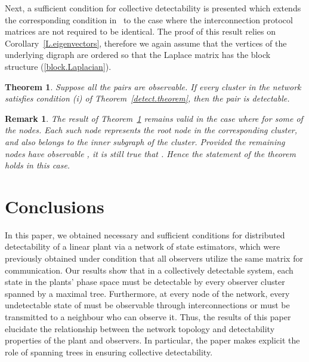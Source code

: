 \documentclass[a4paper,10pt,conference]{ieeeconf}
\newtheorem{theorem}{Theorem}
\newtheorem{remark}{Remark}
\begin{document}
   

Next, a sufficient condition for collective detectability is presented which
extends the corresponding condition in~\cite[Theorem~4]{U7b-journal} to the
case where the interconnection protocol matrices  are not required to be
identical. The proof of this result relies on
Corollary~\ref{L.eigenvectors}, therefore we again assume 
that the vertices of the underlying digraph are ordered so that the Laplace
matrix  has the block structure (\ref{block.Laplacian}).

\begin{theorem}\label{detect.theorem.sufficient}
Suppose all the pairs  are observable. If every cluster in the
network satisfies condition (i) of Theorem~\ref{detect.theorem}, then the
pair  is detectable.  
\end{theorem}


\begin{remark}
  The result of Theorem~\ref{detect.theorem.sufficient} remains
  valid in the case where  for some of the nodes. Each such node
  represents the root node in the corresponding cluster, and also belongs to
  the inner subgraph of the cluster. 
  Provided the remaining nodes have observable , it is still true
  that . Hence the
  statement of the theorem holds in this case.
\end{remark}

\section{Conclusions}\label{Concl}
In this paper, we obtained necessary and sufficient conditions for
distributed detectability of a linear plant via a network of state
estimators, which were previously obtained under condition that all
observers utilize the same matrix for communication. Our results show that
in a collectively detectable system, each state in the plants' phase space
must be detectable by every observer cluster spanned by a maximal
tree. Furthermore, at every node of the network, every undetectable state
of  must be observable through interconnections or must be
transmitted to a neighbour who can observe it. Thus, the results of this
paper elucidate the relationship between the network topology and
detectability properties of the plant and observers. In particular, the paper
makes explicit the role of spanning trees in ensuring collective
detectability.    

 

\end{document}
